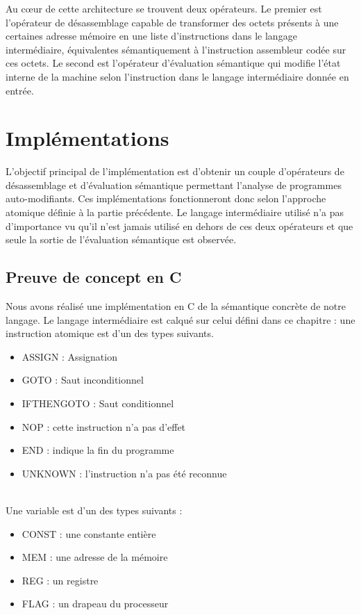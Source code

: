 Au c\oe ur de cette architecture se trouvent deux opérateurs. Le premier est l'opérateur de désassemblage capable de transformer des octets présents à une certaines adresse mémoire en une liste d'instructions dans le langage intermédiaire, équivalentes sémantiquement à l'instruction assembleur codée sur ces octets. 
Le second est l'opérateur d'évaluation sémantique qui modifie l'état interne de la machine selon l'instruction dans le langage intermédiaire donnée en entrée.

\section{Implémentations}
L'objectif principal de l'implémentation est d'obtenir un couple d'opérateurs de désassemblage et d'évaluation sémantique permettant l'analyse de programmes auto-modifiants. Ces implémentations fonctionneront donc selon l'approche atomique définie à la partie précédente.
Le langage intermédiaire utilisé n'a pas d'importance vu qu'il n'est jamais utilisé en dehors de ces deux opérateurs et que seule la sortie de l'évaluation sémantique est observée.

\subsection{Preuve de concept en C}
Nous avons réalisé une implémentation en C de la sémantique concrète de notre langage.
Le langage intermédiaire est calqué sur celui défini dans ce chapitre : une instruction atomique est d'un des types suivants.
\begin{itemize}
 \item ASSIGN : Assignation
 \item GOTO : Saut inconditionnel
 \item IFTHENGOTO : Saut conditionnel
 \item NOP : cette instruction n'a pas d'effet
 \item END : indique la fin du programme
 \item UNKNOWN : l'instruction n'a pas été reconnue
\end{itemize}
~\\
Une variable est d'un des types suivants :
\begin{itemize}
  \item CONST : une constante entière
  \item MEM : une adresse de la mémoire
  \item REG : un registre
  \item FLAG : un drapeau du processeur
\end{itemize}

